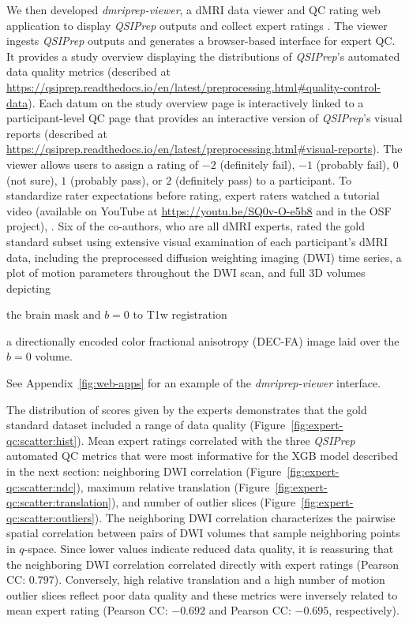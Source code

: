 \documentclass[fleqn,10pt,inline]{wlscirep}
\begin{document}
We then developed \emph{dmriprep-viewer},
a dMRI data viewer and QC rating web application to display \emph{QSIPrep}
outputs and collect expert ratings \cite{richiehalford2022nirv}.
The viewer
ingests \emph{QSIPrep} outputs and generates a browser-based interface for
expert QC. It provides a study overview displaying the distributions of
\emph{QSIPrep}'s automated data quality metrics (described at
\url{https://qsiprep.readthedocs.io/en/latest/preprocessing.html#quality-control-data}).
Each datum on the study overview page is interactively linked to a participant-level
QC page that provides an interactive version of \emph{QSIPrep}'s visual reports
(described at
\url{https://qsiprep.readthedocs.io/en/latest/preprocessing.html#visual-reports}).
The viewer allows users to assign a rating of $-2$ (definitely fail), $-1$
(probably fail), $0$ (not sure), $1$ (probably pass), or $2$ (definitely pass) to a
participant.
To standardize rater expectations before rating, expert raters watched
a tutorial video (available on YouTube at \url{https://youtu.be/SQ0v-O-e5b8} and in the OSF project), .
Six of the
co-authors, who are all dMRI experts, rated the gold standard subset
using extensive visual examination of each participant's dMRI data,
including the preprocessed diffusion weighting imaging (DWI) time series, a plot of
motion parameters throughout the DWI scan, and full 3D volumes depicting
\begin{enumerate*}[%
    label=(\roman*),%
    before={{ }},%
    itemjoin={{, }},%
    itemjoin*={{ and }}]
    \item the brain mask and $b=0$ to T1w registration
    \item a directionally encoded color fractional anisotropy (DEC-FA) image laid over the $b=0$ volume.
\end{enumerate*}
See Appendix~\ref{fig:web-apps} for an example of the \emph{dmriprep-viewer} interface.

The distribution of scores given by the experts demonstrates that the
gold standard dataset included a range of data quality (Figure~\ref{fig:expert-qc:scatter:hist}). Mean expert ratings
correlated with the three \emph{QSIPrep} automated QC metrics that were most informative for the XGB model described in the next section:
neighboring DWI correlation \cite{yeh2019-kb} (Figure~\ref{fig:expert-qc:scatter:ndc}), maximum relative
translation (Figure~\ref{fig:expert-qc:scatter:translation}), and number of outlier slices (Figure~\ref{fig:expert-qc:scatter:outliers}). The neighboring DWI correlation characterizes
the pairwise spatial correlation between pairs of DWI volumes that sample
neighboring points in $q$-space. Since lower values indicate reduced data
quality, it is reassuring that the neighboring DWI correlation correlated directly with expert ratings
(Pearson CC: $0.797$). Conversely, high relative translation and a high number of
motion outlier slices reflect poor data quality and these metrics were inversely
related to mean expert rating (Pearson CC: $-0.692$ and Pearson CC: $-0.695$,
respectively).
\end{document}

